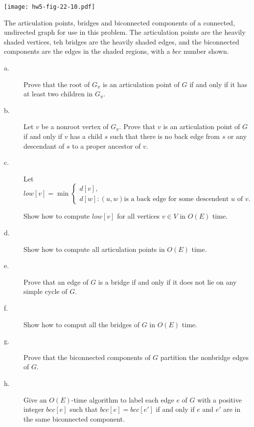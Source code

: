 \begin{center}
\texttt{[image: hw5-fig-22-10.pdf]}
\end{center}

{
\small{
The articulation points, bridges and biconnected components of a connected, undirected graph for use in this problem. The articulation points are the heavily shaded vertices, teh bridges
are the heavily shaded edges, and the biconnected components are the edges in the shaded regions, with a $bcc$ number shown.}
}

\begin{description}
\item[a. \hspace{9pt}] Prove that the root of $G_\pi$ is an articulation point of $G$ if and only if it has at least two children in $G_\pi$.

\item[b. \hspace{9pt}] Let $v$ be a nonroot vertex of $G_\pi$. Prove that $v$ is an articulation point of $G$ if and only if $v$ has a child $s$ such that there is no back edge from $s$ or
any descendant of $s$ to a proper ancestor of $v$.

\item[c. \hspace{9pt}] Let
\begin{equation*}
low[v] = \min\left\{
  \begin{array}{l}
    d[v],\\
    d[w]:(u, w)\text{is a back edge for some descendent $u$ of $v$.}
  \end{array}
\right.
\end{equation*}

Show how to compute $low[v]$ for all vertices $v\in V$ in $O(E)$ time.

\item[d. \hspace{9pt}] Show how to compute all articulation points in $O(E)$ time.

\item[e. \hspace{9pt}] Prove that an edge of $G$ is a bridge if and only if it does not lie on any simple cycle of $G$.

\item[f. \hspace{9pt}] Show how to comput all the bridges of $G$ in $O(E)$ time.

\item[g. \hspace{9pt}] Prove that the biconnected components of $G$ partition the nonbridge edges of $G$.

\item[h. \hspace{9pt}] Give an $O(E)$-time algorithm to label each edge $e$ of $G$ with a positive integer $bcc[e]$ such that $bcc[e] = bcc[e']$ if and only if $e$ and $e'$ are
in the same biconnected component.

\end{description}
\answer

